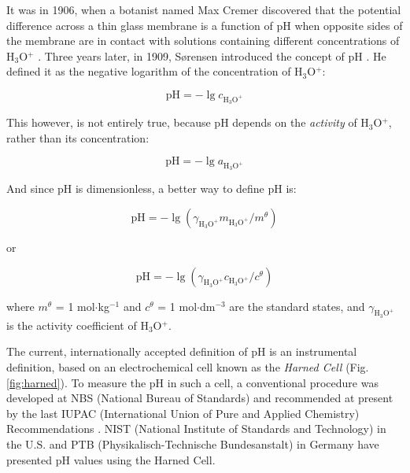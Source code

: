 It was in 1906, when a botanist named Max Cremer discovered that the potential difference across a thin glass membrane is a function of pH when opposite sides of the membrane are in contact with solutions containing different concentrations of H$_3$O$^+$ \cite{cremer1906ursache, cremer1906direkte}.
Three years later, in 1909, S\o rensen introduced the concept of pH \cite{sorensen1909messung}.
He defined it as the negative logarithm of the concentration of H$_3$O$^+$:

\begin{equation}
\textrm{pH} = -\lg c_{\textrm{H}_3\textrm{O}^+}
\end{equation}

This however, is not entirely true, because pH depends on the \emph{activity} of H$_3$O$^+$, rather than its concentration:

\begin{equation}
\textrm{pH} = -\lg a_{\textrm{H}_3\textrm{O}^+}
\end{equation}

And since pH is dimensionless, a better way to define pH is:

\begin{equation}
\textrm{pH} = -\lg(\gamma_{\textrm{H}_3\textrm{O}^+} m_{\textrm{H}_3\textrm{O}^+} / m^\theta)
\end{equation}

or

\begin{equation}
\textrm{pH} = -\lg(\gamma_{\textrm{H}_3\textrm{O}^+} c_{\textrm{H}_3\textrm{O}^+} / c^\theta)
\end{equation}

where $m^\theta$ = 1 mol$\cdot$kg$^{-1}$ and $c^\theta$ = 1 mol$\cdot$dm$^{-3}$ are the standard states, and $\gamma_{\textrm{H}_3\textrm{O}^+}$ is the activity coefficient of H$_3$O$^+$. 

The current, internationally accepted definition of pH is an instrumental definition, based on an electrochemical cell known as the \emph{Harned Cell} \cite{harned1958activity} (Fig. \ref{fig:harned}).
To measure the pH in such a cell, a conventional procedure was developed at NBS (National Bureau of Standards) \cite{durst1975standardization} and recommended at present by the last IUPAC (International Union of Pure and Applied Chemistry) Recommendations \cite{covington2002measurement}.
NIST (National Institute of Standards and Technology) in the U.S. and PTB (Physikalisch-Technische Bundesanstalt) in Germany have presented pH values using the Harned Cell. 

